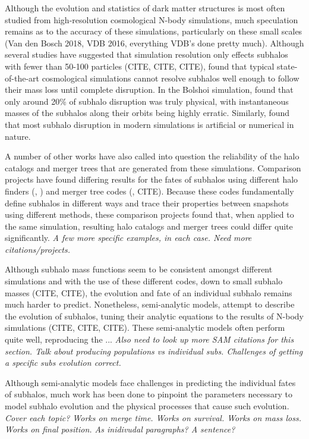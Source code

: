 \documentclass[fleqn,usenatbib]{mnras}
\begin{document}
Although the evolution and statistics of dark matter structures is most often studied from high-resolution cosmological N-body simulations, much speculation remains as to the accuracy of these simulations, particularly on these small scales (Van den Bosch 2018, VDB 2016, everything VDB's done pretty much). Although several studies have suggested that simulation resolution only effects subhalos with fewer than 50-100 particles (CITE, CITE, CITE), \citet{VDB2018} found that typical state-of-the-art cosmological simulations cannot resolve subhalos well enough to follow their mass loss until complete disruption. In the Bolshoi simulation, \citet{VDB2016} found that only around 20\% of subhalo disruption was truly physical, with instantaneous masses of the subhalos along their orbits being highly erratic. Similarly, \citet{VDB2017} found that most subhalo disruption in modern simulations is artificial or numerical in nature.

A number of other works have also called into question the reliability of the halo catalogs and merger trees that are generated from these simulations. Comparison projects have found differing results for the fates of subhalos using different halo finders (\citet{Knebe2011}, \citet{Avila2013}) and merger tree codes (\citet{Srisawat2013}, CITE). Because these codes fundamentally define subhalos in different ways and trace their properties between snapshots using different methods, these comparison projects found that, when applied to the same simulation, resulting halo catalogs and merger trees could differ quite significantly. \textit{A few more specific examples, in each case. Need more citations/projects.}

Although subhalo mass functions seem to be consistent amongst different simulations and with the use of these different codes, down to small subhalo masses (CITE, CITE), the evolution and fate of an individual subhalo remains much harder to predict. Nonetheless, semi-analytic models, attempt to describe the evolution of subhalos, tuning their analytic equations to the results of N-body simulations (CITE, CITE, CITE). These semi-analytic models often perform quite well, reproducing the ... \textit{Also need to look up more SAM citations for this section. Talk about producing populations vs individual subs. Challenges of getting a specific subs evolution correct.}

Although semi-analytic models face challenges in predicting the individual fates of subhalos, much work has been done to pinpoint the parameters necessary to model subhalo evolution and the physical processes that cause such evolution. \textit{Cover each topic? Works on merge time. Works on survival. Works on mass loss. Works on final position. As inidivudal paragraphs? A sentence?}
\end{document}
